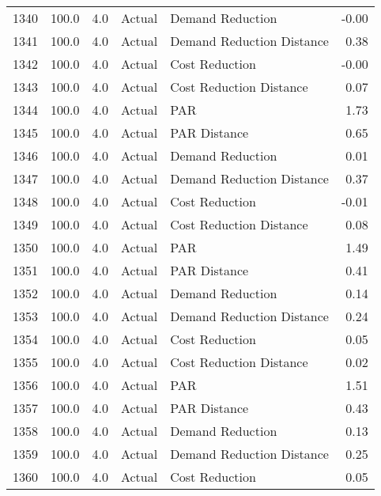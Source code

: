 \begin{longtable}{lrrllr}
1340 &        100.0 &     4.0 &         Actual &           Demand Reduction &  -0.00 \\
1341 &        100.0 &     4.0 &         Actual &  Demand Reduction Distance &   0.38 \\
1342 &        100.0 &     4.0 &         Actual &             Cost Reduction &  -0.00 \\
1343 &        100.0 &     4.0 &         Actual &    Cost Reduction Distance &   0.07 \\
1344 &        100.0 &     4.0 &         Actual &                        PAR &   1.73 \\
1345 &        100.0 &     4.0 &         Actual &               PAR Distance &   0.65 \\
1346 &        100.0 &     4.0 &         Actual &           Demand Reduction &   0.01 \\
1347 &        100.0 &     4.0 &         Actual &  Demand Reduction Distance &   0.37 \\
1348 &        100.0 &     4.0 &         Actual &             Cost Reduction &  -0.01 \\
1349 &        100.0 &     4.0 &         Actual &    Cost Reduction Distance &   0.08 \\
1350 &        100.0 &     4.0 &         Actual &                        PAR &   1.49 \\
1351 &        100.0 &     4.0 &         Actual &               PAR Distance &   0.41 \\
1352 &        100.0 &     4.0 &         Actual &           Demand Reduction &   0.14 \\
1353 &        100.0 &     4.0 &         Actual &  Demand Reduction Distance &   0.24 \\
1354 &        100.0 &     4.0 &         Actual &             Cost Reduction &   0.05 \\
1355 &        100.0 &     4.0 &         Actual &    Cost Reduction Distance &   0.02 \\
1356 &        100.0 &     4.0 &         Actual &                        PAR &   1.51 \\
1357 &        100.0 &     4.0 &         Actual &               PAR Distance &   0.43 \\
1358 &        100.0 &     4.0 &         Actual &           Demand Reduction &   0.13 \\
1359 &        100.0 &     4.0 &         Actual &  Demand Reduction Distance &   0.25 \\
1360 &        100.0 &     4.0 &         Actual &             Cost Reduction &   0.05 \\

\end{longtable}
